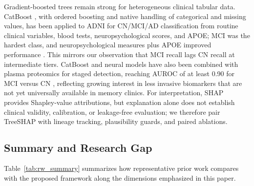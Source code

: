 \documentclass[11pt,a4paper]{article}
\begin{document}
Gradient-boosted trees remain strong for heterogeneous clinical tabular data. CatBoost \cite{prokhorenkova2018catboost}, with ordered boosting and native handling of categorical and missing values, has been applied to ADNI for CN/MCI/AD classification from routine clinical variables, blood tests, neuropsychological scores, and APOE; MCI was the hardest class, and neuropsychological measures plus APOE improved performance \cite{pmc2026mcicatboost}. This mirrors our observation that MCI recall lags CN recall at intermediate tiers. CatBoost and neural models have also been combined with plasma proteomics for staged detection, reaching AUROC of at least 0.90 for MCI versus CN \cite{qin2024plasma}, reflecting growing interest in less invasive biomarkers that are not yet universally available in memory clinics. For interpretation, SHAP \cite{lundberg2017shap} provides Shapley-value attributions, but explanation alone does not establish clinical validity, calibration, or leakage-free evaluation; we therefore pair TreeSHAP with lineage tracking, plausibility guards, and paired ablations.

\subsection{Summary and Research Gap}
\label{subsec:rw_gap}

Table~\ref{tab:rw_summary} summarizes how representative prior work compares with the proposed framework along the dimensions emphasized in this paper.
\end{document}
